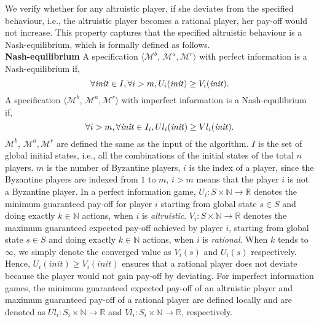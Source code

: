 We verify whether for any altruistic player, if she deviates from the specified behaviour, i.e., the altruistic player becomes a rational player,
her pay-off would not increase. This property captures that the specified altruistic behaviour is a Nash-equilibrium, which is formally defined as follows.\\
{\bf{Nash-equilibrium}}\label{p:ne}
A specification $\langle \mathcal{M}^b$, $\mathcal{M}^a, \mathcal{M}^r\rangle$ with perfect information
is a Nash-equilibrium if, 
\begin{equation}
\label{eq:NEglobal}
	\forall \mi{init} \in I, 
	\forall i > m, 
	U_i(\mi{init}) \geq V_i(\mi{init}).
\end{equation}
A specification $\langle \mathcal{M}^b$, $\mathcal{M}^a, \mathcal{M}^r\rangle$ with imperfect information
is a Nash-equilibrium if, 
\begin{equation}
\label{eq:NElocal}
\forall i > m, 
\forall \mi{init} \in I_i, 
Ul_i(\mi{init}) \geq Vl_i(\mi{init}).
\end{equation}
$\mathcal{M}^b$, $\mathcal{M}^a, \mathcal{M}^r$ are defined the same as the input of the algorithm. $I$ is the set of global initial states, i.e., all the combinations of the initial states of the total $n$ players. $m$ is the number of Byzantine players,
$i$ is the index of a player, since the Byzantine players are indexed from $1$ to $m$, $i>m$ means that the player $i$ is not a Byzantine player.  
In a perfect information game, $U_i: S \times \mathbb{N} \rightarrow \mathbb{R}$ denotes the minimum guaranteed pay-off for player $i$ starting from global state $s\in S$ and doing exactly $k\in \mathbb{N}$ actions, when $i$ is \emph{altruistic}.
$V_i: S \times \mathbb{N} \rightarrow \mathbb{R}$ denotes the maximum guaranteed expected pay-off achieved by player $i$, starting from global state $s\in S$ and doing exactly $k\in \mathbb{N}$ actions, when $i$ is \emph{rational}. When $k$ tends to $\infty$, we simply denote the converged value as $V_i(s)$ and $U_i(s)$ respectively. Hence, $U_i(init) \geq V_i(init)$ ensures that a rational player does not deviate because the player would not gain pay-off by deviating.
For imperfect information games, the minimum guaranteed expected pay-off of an altruistic player and maximum guaranteed pay-off of a rational player are defined locally and are denoted as $Ul_i: S_i \times \mathbb{N} \rightarrow \mathbb{R}$ and $Vl_i: S_i \times \mathbb{N} \rightarrow \mathbb{R}$, respectively. 


